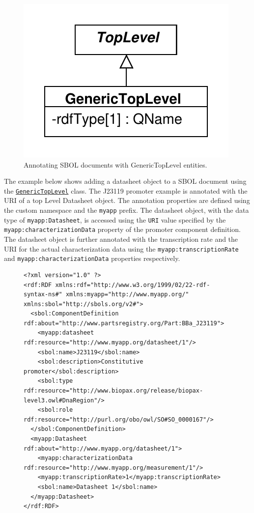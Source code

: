 \documentclass[draftspec]{sbmlpkgspec}
\newcommand{\lstsetsbol}{
 \lstset{language=sbol,
        tabsize=2
 }
}
\newcommand{\sbol}[1]{\texttt{\hyperref[sec:#1]{#1}}}
\newcommand{\external}[1]{\texttt{#1}}
\begin{document}
\begin{figure}[ht]
\begin{center}
\includegraphics[scale=0.6]{uml/generictoplevel}
\caption[]{Annotating SBOL documents with GenericTopLevel entities.}
\label{uml:generictoplevel}
\end{center}
\end{figure}

The example below shows adding a datasheet object to a SBOL document using the \sbol{GenericTopLevel} class. The J23119 promoter example is annotated with the URI of a top Level Datasheet object. The annotation properties are defined using the custom \external{} namespace and the \external{myapp} prefix. The datasheet object, with the data type of \external{myapp:Datasheet}, is accessed using the \external{URI} value specified by the \external{myapp:characterizationData} property of the promoter component definition. The datasheet object is further annotated with the transcription rate and the URI for the actual characterization data using the \external{myapp:transcriptionRate} and \external{myapp:characterizationData} properties respectively.

\begin{figure}[ht]
\lstsetsbol
\begin{lstlisting}
<?xml version="1.0" ?>
<rdf:RDF xmlns:rdf="http://www.w3.org/1999/02/22-rdf-syntax-ns#" xmlns:myapp="http://www.myapp.org/" xmlns:sbol="http://sbols.org/v2#">
  <sbol:ComponentDefinition rdf:about="http://www.partsregistry.org/Part:BBa_J23119">
    <myapp:datasheet rdf:resource="http://www.myapp.org/datasheet/1"/>
    <sbol:name>J23119</sbol:name>
    <sbol:description>Constitutive promoter</sbol:description>
    <sbol:type rdf:resource="http://www.biopax.org/release/biopax-level3.owl#DnaRegion"/>
    <sbol:role rdf:resource="http://purl.org/obo/owl/SO#SO_0000167"/>
  </sbol:ComponentDefinition>
  <myapp:Datasheet rdf:about="http://www.myapp.org/datasheet/1">
    <myapp:characterizationData rdf:resource="http://www.myapp.org/measurement/1"/>
    <myapp:transcriptionRate>1</myapp:transcriptionRate>
    <sbol:name>Datasheet 1</sbol:name>
  </myapp:Datasheet>
</rdf:RDF>

\end{lstlisting}
\label{ser:GenericTopLevel}
\end{figure}
\end{document}
